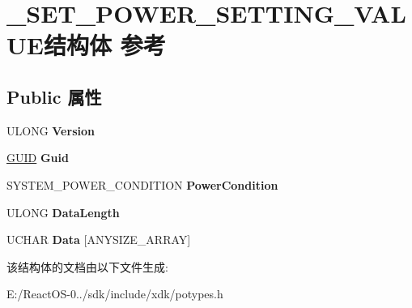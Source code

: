 \hypertarget{struct___s_e_t___p_o_w_e_r___s_e_t_t_i_n_g___v_a_l_u_e}{}\section{\+\_\+\+S\+E\+T\+\_\+\+P\+O\+W\+E\+R\+\_\+\+S\+E\+T\+T\+I\+N\+G\+\_\+\+V\+A\+L\+U\+E结构体 参考}
\label{struct___s_e_t___p_o_w_e_r___s_e_t_t_i_n_g___v_a_l_u_e}
\subsection*{Public 属性}
\begin{DoxyCompactItemize}
\item 
\mbox{\label{struct___s_e_t___p_o_w_e_r___s_e_t_t_i_n_g___v_a_l_u_e_aefba9507e7223adc87114abfa915e971}} 
U\+L\+O\+NG {\bfseries Version}
\item 
\mbox{\label{struct___s_e_t___p_o_w_e_r___s_e_t_t_i_n_g___v_a_l_u_e_a9a72d61a5039b82a6eba7987e8dc6d7a}} 
\hyperlink{interface_g_u_i_d}{G\+U\+ID} {\bfseries Guid}
\item 
\mbox{\label{struct___s_e_t___p_o_w_e_r___s_e_t_t_i_n_g___v_a_l_u_e_a1d53ce1bf21d09041003995465e2de0c}} 
S\+Y\+S\+T\+E\+M\+\_\+\+P\+O\+W\+E\+R\+\_\+\+C\+O\+N\+D\+I\+T\+I\+ON {\bfseries Power\+Condition}
\item 
\mbox{\label{struct___s_e_t___p_o_w_e_r___s_e_t_t_i_n_g___v_a_l_u_e_ad58c9c9bd34a6b4469b6ff0a419c43ae}} 
U\+L\+O\+NG {\bfseries Data\+Length}
\item 
\mbox{\label{struct___s_e_t___p_o_w_e_r___s_e_t_t_i_n_g___v_a_l_u_e_a3b8737880ba139f0dbf2061dfc2de902}} 
U\+C\+H\+AR {\bfseries Data} \mbox{[}A\+N\+Y\+S\+I\+Z\+E\+\_\+\+A\+R\+R\+AY\mbox{]}
\end{DoxyCompactItemize}


该结构体的文档由以下文件生成\+:\begin{DoxyCompactItemize}
\item 
E\+:/\+React\+O\+S-\/0../sdk/include/xdk/potypes.\+h\end{DoxyCompactItemize}

